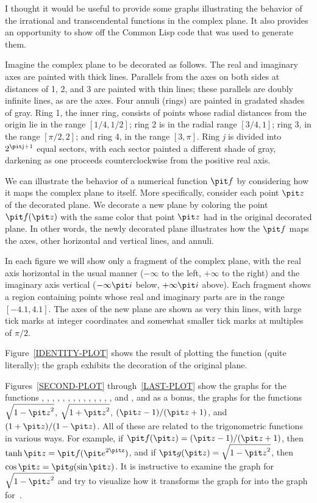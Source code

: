 \begin{new}
I thought it would be useful to provide some graphs illustrating the behavior
of the irrational and transcendental functions in the complex plane.
It also provides an opportunity to show off the Common Lisp code that
was used to generate them.

Imagine the complex plane to be decorated
as follows.  The real and imaginary axes are painted with thick lines.
Parallels from the axes on both sides at distances of 1, 2, and 3 are painted
with thin lines; these parallels are doubly infinite lines, as are the axes.
Four annuli (rings) are painted in gradated shades of gray.  Ring 1, the inner ring,
consists of points whose radial distances from the origin lie in the range
$[1/4,1/2]$; ring 2 is in the radial range
$[3/4, 1]$; ring 3, in the range
$[\pi /2, 2]$; and ring 4, in the range $[3, \pi]$.
Ring {\it j} is divided into $2^{\hbox{\scriptsize\it j}+1}$ equal sectors, with each sector
painted a different shade of gray, darkening as one proceeds counterclockwise
from the positive real axis.

We can illustrate the behavior of a numerical function ${\it f}$ by considering how
it maps the complex plane to itself.  More specifically, consider each
point ${\it z}$ of the decorated plane.  We decorate a new plane by coloring
the point ${\it f}({\it z})$ with the same color that point ${\it z}$ had in the original
decorated plane.  In other words, the newly decorated plane illustrates
how the ${\it f}$ maps the axes, other horizontal and vertical lines, and annuli.

In each figure we will show only a fragment of the complex plane,
with the real axis horizontal in the usual manner ($-\infty$ to the left, $+\infty$
to the right) and the imaginary axis vertical ($-\infty {\it i}$ below, $+\infty {\it i}$
above).  Each fragment shows a region containing points whose real and imaginary
parts are in the range $[-4.1, 4.1]$.  The axes of the new plane are shown as very
thin lines, with large tick marks at integer coordinates and somewhat smaller
tick marks at multiples of $\pi/2$.

Figure~\ref{IDENTITY-PLOT} shows the result of plotting the  function
(quite literally); the graph exhibits the decoration of the original plane.

Figures~\ref{SECOND-PLOT} through~\ref{LAST-PLOT} show the graphs for the functions
, , , , , , , , ,
, , , , , and , and
as a bonus, the graphs for the functions $\sqrt{1-{\it z}^2}$,
$\sqrt{1+{\it z}^2}$, $({\it z}-1)/({\it z}+1)$, and $(1+{\it z})/(1-{\it z})$.  All of these are related
to the trigonometric functions in various ways.  For example, if
${\it f}({\it z})=({\it z}-1)/({\it z}+1)$, then $\tanh {\it z} = {\it f}({\it e}^{2\hbox{\scriptsize\it z}})$, and if ${\it g}({\it z})=\sqrt{1-{\it z}^2}$, then
$\cos {\it z} = {\it g}(\sin {\it z})$.  It is instructive to examine the graph for $\sqrt{1-{\it z}^2}$
and try to visualize how it transforms the graph for  into the graph for~.


\end{new}
